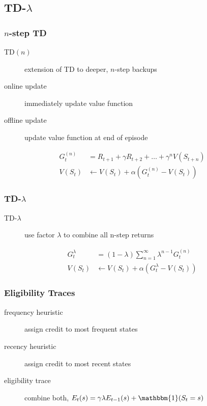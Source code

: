 \documentclass[]{article}
\theoremstyle{definition}
\begin{document}
\subsection{TD-$\lambda$}%
\label{sub:td_lambda_}

\subsubsection{$n$-step TD}%
\label{ssub:_n_step_td}

\begin{description}
    \item[TD$(n)$] extension of TD to deeper, $n$-step backups
    \item[online update] immediately update value function
    \item[offline update] update value function at end of episode
\end{description}
\begin{align*}
    G_t^{(n)} &= R_{t+1} + \gamma R_{t+2} + \ldots + \gamma^n V(S_{t+n}) \\
    V(S_t) &\gets V(S_t) + \alpha (G_t^{(n)} - V(S_t))
\end{align*}

\subsubsection{TD-$\lambda$}%
\label{ssub:averaging_n_step_returns}
\begin{description}
    \item[TD-$\lambda$] use factor $\lambda$ to combine all n-step returns
\end{description}

\begin{align*}
    G_t^{\lambda} &= (1 - \lambda) \sum_{n=1}^\infty \lambda^{n-1} G_t^{(n)} \\
    V(S_t) &\gets V(S_t) + \alpha (G_t^\lambda - V(S_t))
\end{align*}

\subsubsection{Eligibility Traces}%
\label{ssub:eligibility_traces}
\begin{description}
    \item[frequency heuristic] assign credit to most frequent states
    \item[recency heuristic] assign credit to most recent states
    \item[eligibility trace] combine both, $E_t(s) = \gamma \lambda E_{t-1}(s) + \mathbbm{1} (S_t = s)$
\end{description}
\end{document}
